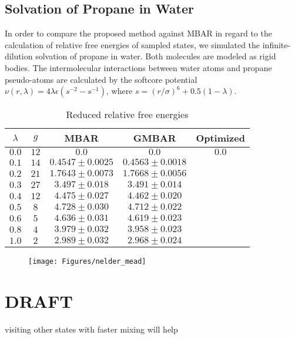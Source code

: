 \documentclass[aip,jcp,preprint,amsmath,amssymb]{revtex4-1}
\begin{document}
\subsection{Solvation of Propane in Water}

In order to compare the proposed method against MBAR in regard to the calculation of relative free energies of sampled states, we simulated the infinite-dilution solvation of propane in water. Both molecules are modeled as rigid bodies. The intermolecular interactions between water atoms and propane pseudo-atoms are calculated by the softcore potential\cite{Beutler_1994} $\nu(r,\lambda) = 4\lambda\epsilon(s^{-2} - s^{-1})$, where $s = (r/\sigma)^6 + 0.5 (1-\lambda)$.

\begin{table}
\caption{Reduced relative free energies}
\label{table:propane solvation}
\begin{ruledtabular}
\begin{tabular}{ccccc}
$\lambda$ & $g$ & MBAR & GMBAR & Optimized \\
\hline
$0.0$ & $12$ & $0.0$ & $0.0$ & $0.0$ \\
$0.1$ & $14$ & $0.4547 \pm 0.0025$ & $0.4563 \pm 0.0018$ \\
$0.2$ & $21$ & $1.7643 \pm 0.0073$ & $1.7668 \pm 0.0056$ \\
$0.3$ & $27$ &  $3.497 \pm 0.018$  &  $3.491 \pm 0.014$ \\
$0.4$ & $12$ &  $4.475 \pm 0.027$  &  $4.462 \pm 0.020$ \\
$0.5$ & $8$  &  $4.728 \pm 0.030$  &  $4.712 \pm 0.022$ \\
$0.6$ & $5$  &  $4.636 \pm 0.031$  &  $4.619 \pm 0.023$ \\
$0.8$ & $4$  &  $3.979 \pm 0.032$  &  $3.958 \pm 0.023$ \\
$1.0$ & $2$  &  $2.989 \pm 0.032$  &  $2.968 \pm 0.024$
\end{tabular}
\end{ruledtabular}
\end{table}

\begin{figure}
\centering
\texttt{[image: Figures/nelder\_mead]}
\caption{}
\label{fig:nelder_mead}
\end{figure}


\section{DRAFT}

visiting other states with faster mixing will help 
\end{document}
